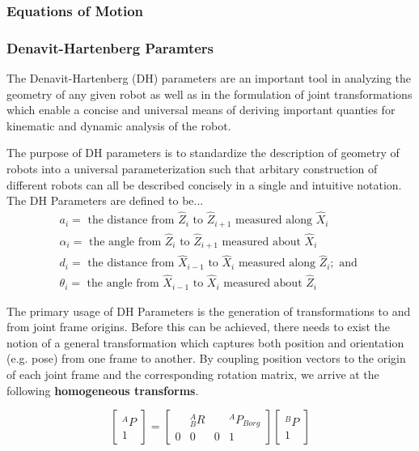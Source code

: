 \documentclass[journal]{IEEEtran}
\begin{document}
\subsubsection{Equations of Motion}



\subsubsection{Denavit-Hartenberg Paramters}


The Denavit-Hartenberg (DH) parameters are an important tool in analyzing the geometry of any given robot as well as in the formulation of joint transformations which enable a concise and universal means of deriving important quanties for kinematic and dynamic analysis of the robot.

The purpose of DH parameters is to standardize the description of geometry of robots into a universal parameterization such that arbitary construction of different robots can all be described concisely in a single and intuitive notation. \\

\noindent The DH Parameters are defined to be...
$$
\begin{array}{l}
a_{i}=\text { the distance from } \hat{Z}_{i} \text { to } \hat{Z}_{i+1} \text { measured along } \hat{X}_{i} \\
\alpha_{i}=\text { the angle from } \hat{Z}_{i} \text { to } \hat{Z}_{i+1} \text { measured about } \hat{X}_{i} \\
d_{i}=\text { the distance from } \hat{X}_{i-1} \text { to } \hat{X}_{i} \text { measured along } \hat{Z}_{i} ; \text { and } \\
\theta_{i}=\text { the angle from } \hat{X}_{i-1} \text { to } \hat{X}_{i} \text { measured about } \hat{Z}_{i}
\end{array}
$$

The primary usage of DH Parameters is the generation of transformations to and from joint frame origins. Before this can be achieved, there needs to exist the notion of a general transformation which captures both position and orientation (e.g. pose) from one frame to another. By coupling position vectors to the origin of each joint frame and the corresponding rotation matrix, we arrive at the following \textbf{homogeneous transforms}.


$$
\left[\begin{array}{c}
{}^{A}P \\
1
\end{array}\right]=\left[\begin{array}{ccc|c}
{} & {}^{A}_{B}R & & {}^{A}P_{B org} \\
\hline 0 & 0 & 0 & 1
\end{array}\right]\left[\begin{array}{c}
{}^{B}P \\
1
\end{array}\right]
$$
\end{document}
